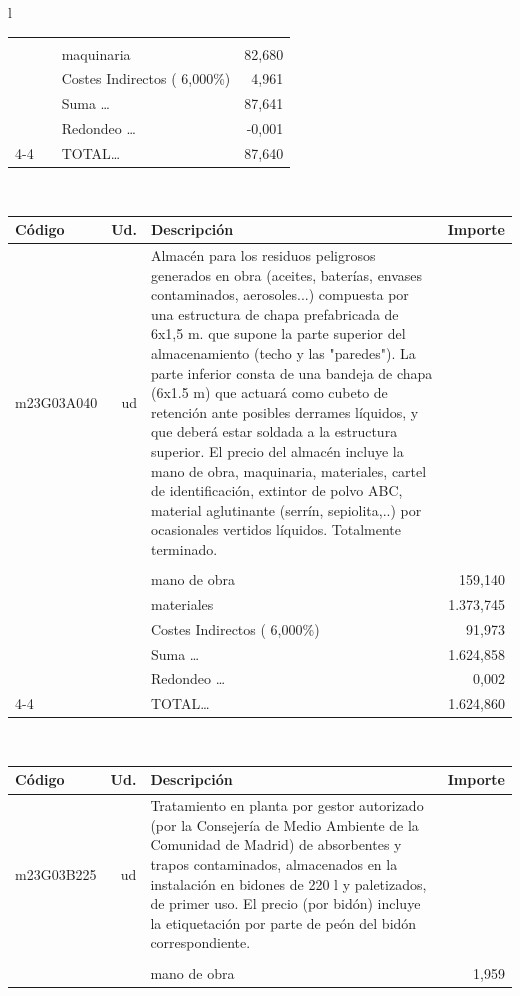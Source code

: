\documentclass{book}%
\begin{document}
\begin{longtable}{l}
\begin{tabular}{l r p{60mm} r}
&&&\\%
&&maquinaria&    82,680\\%
&&Costes Indirectos (     6,000\%)&     4,961\\%
&&Suma \ldots&    87,641\\%
&&Redondeo \ldots&    {-}0,001\\%
\cline{4-4}%
&&TOTAL\ldots&    87,640\\%
\end{tabular}\\%
\begin{tabular}{l r p{60mm} r}%
Código&Ud.&Descripción&Importe\\%
\hline%
m23G03A040&ud&Almacén para los residuos peligrosos generados en obra (aceites, baterías, envases contaminados, aerosoles...) compuesta por una estructura de chapa prefabricada de 6x1,5 m. que supone la parte superior del almacenamiento (techo y las "paredes"). La parte inferior consta de una bandeja de chapa (6x1.5 m) que actuará como cubeto de retención ante posibles derrames líquidos, y que deberá estar soldada a la estructura superior. El precio del almacén incluye la mano de obra, maquinaria, materiales, cartel de identificación, extintor de polvo ABC, material aglutinante (serrín, sepiolita,..) por ocasionales vertidos líquidos. Totalmente terminado.&\\%
&&&\\%
&&mano de obra&   159,140\\%
&&materiales& 1.373,745\\%
&&Costes Indirectos (     6,000\%)&    91,973\\%
&&Suma \ldots& 1.624,858\\%
&&Redondeo \ldots&     0,002\\%
\cline{4-4}%
&&TOTAL\ldots& 1.624,860\\%
\end{tabular}\\%
\begin{tabular}{l r p{60mm} r}%
Código&Ud.&Descripción&Importe\\%
\hline%
m23G03B225&ud&Tratamiento en planta por gestor autorizado (por la Consejería de Medio Ambiente de la Comunidad de Madrid) de absorbentes y trapos contaminados, almacenados en la instalación en bidones de 220 l y paletizados, de primer uso. El precio (por bidón) incluye la etiquetación por parte de peón del bidón correspondiente.&\\%
&&&\\%
&&mano de obra&     1,959\\%

\end{tabular}
\end{longtable}
\end{document}
